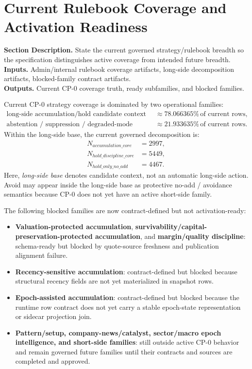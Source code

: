\documentclass[11pt]{report}
\newcommand{\meta}[3]{\textbf{Section Description.} #1\\
\textbf{Inputs.} #2\\
\textbf{Outputs.} #3\par}
\begin{document}
\section{Current Rulebook Coverage and Activation Readiness}
\meta{State the current governed strategy/rulebook breadth so the specification distinguishes active coverage from intended future breadth.}{Admin/internal rulebook coverage artifacts, long-side decomposition artifacts, blocked-family contract artifacts.}{Current CP-0 coverage truth, ready subfamilies, and blocked families.}

Current CP-0 strategy coverage is dominated by two operational families:
\begin{align*}
\text{long-side accumulation/hold candidate context} &\approx 78.066365\% \, \text{of current rows},\\
\text{abstention / suppression / degraded-mode handling} &\approx 21.933635\% \, \text{of current rows}.
\end{align*}
Within the long-side base, the current governed decomposition is:
\begin{align*}
N_{accumulation\_core} &= 2997,\\
N_{hold\_discipline\_core} &= 5449,\\
N_{hold\_only\_no\_add} &= 4467.
\end{align*}
Here, \emph{long-side base} denotes candidate context, not an automatic long-side action. Avoid may appear inside the long-side base as protective no-add / avoidance semantics because CP-0 does not yet have an active short-side family.

The following blocked families are now contract-defined but not activation-ready:
\begin{itemize}
    \item \textbf{Valuation-protected accumulation}, \textbf{survivability/capital-preservation-protected accumulation}, and \textbf{margin/quality discipline}: schema-ready but blocked by quote-source freshness and publication alignment failure.
    \item \textbf{Recency-sensitive accumulation}: contract-defined but blocked because structural recency fields are not yet materialized in snapshot rows.
    \item \textbf{Epoch-assisted accumulation}: contract-defined but blocked because the runtime row contract does not yet carry a stable epoch-state representation or sidecar projection join.
    \item \textbf{Pattern/setup, company-news/catalyst, sector/macro epoch intelligence, and short-side families}: still outside active CP-0 behavior and remain governed future families until their contracts and sources are completed and approved.
\end{itemize}
\end{document}
